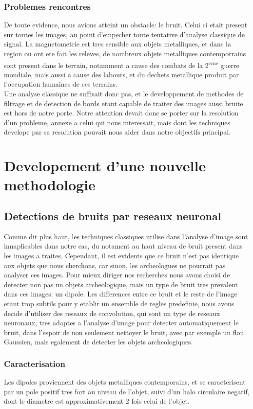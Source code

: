 \documentclass[a4paper, 12pt, titlepage, oneside]{article}
\begin{document}
	\subsubsection{Problemes rencontres}
	De toute evidence, nous avions atteint un obstacle: le bruit. Celui ci etait present sur toutes les images, au point d'empecher toute tentative d'analyse classique de signal. La magnetometrie est tres sensible aux objets metalliques, et dans la region ou ont ete fait les releves, de nombreux objets metalliques contemporrains sont present dans le terrain, notamment a cause des combats de la 2\textsuperscript{eme} guerre mondiale, mais aussi a cause des labours, et du dechets metallique produit par l'occupation humaines de ces terrains.\\
	Une analyse classique ne suffisait donc pas, et le developpement de methodes de filtrage et de detection de bords etant capable de traiter des images aussi bruite est hors de notre porte. Notre attention devait donc se porter sur la resolution d'un probleme, annexe a celui qui nous interessait, mais dont les techniques develope par sa resolution pouvait nous aider dans notre objectifs principal.

\newpage
\section{Developement d'une nouvelle methodologie}
	\subsection{Detections de bruits par reseaux neuronal}
	Comme dit plus haut, les techniques classiques utilise dans l'analyse d'image sont innaplicables dans notre cas, du notament au haut niveau de bruit present dans les images a traites. Cependant, il est evidents que ce bruit n'est pas identique aux objets que nous cherchons, car sinon, les archeologues ne pourrait pas analyser ces images. Pour mieux diriger nos recherches nous avons choisi de detecter non pas un objets archeologique, mais un type de bruit tres prevalent dans ces images: un dipole. Les differences entre ce bruit et le reste de l'image etant trop subtils pour y etablir un ensemble de regles predefinie, nous avons decide d'utiliser des reseaux de convolution, qui sont un type de reseaux neuronaux, tres adaptes a l'analyse d'image pour detecter automatiquement le bruit, dans l'espoir de non seulement nettoyer le bruit, avec par exemple un flou Gaussien, mais egalement de detecter les objets archeologiques.
	\subsubsection{Caracterisation}
	Les dipoles proviennent des objets metalliques contemporains, et se caracterisent par un pole positif tres fort au niveau de l'objet, suivi d'un halo circulaire negatif, dont le diametre est approximativement 2 fois celui de l'objet.
\end{document}
